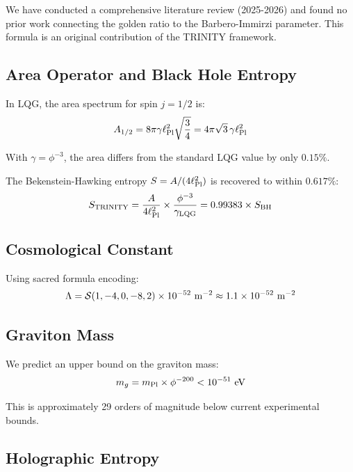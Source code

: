 \documentclass[12pt,a4paper]{article}
\newcommand{\sacred}{{\cal S}}
\begin{document}
We have conducted a comprehensive literature review (2025-2026) and found no prior work connecting the golden ratio to the Barbero-Immirzi parameter. This formula is an original contribution of the TRINITY framework.

\subsection{Area Operator and Black Hole Entropy}

In LQG, the area spectrum for spin $j = 1/2$ is:
\begin{equation}
A_{1/2} = 8\pi\gamma\ell_{\rm Pl}^2\sqrt{\frac{3}{4}} = 4\pi\sqrt{3}\,\gamma\ell_{\rm Pl}^2
\end{equation}

With $\gamma = \phi^{-3}$, the area differs from the standard LQG value by only $0.15\%$.

The Bekenstein-Hawking entropy $S = A/(4\ell_{\rm Pl}^2)$ is recovered to within $0.617\%$:
\begin{equation}
S_{\rm TRINITY} = \frac{A}{4\ell_{\rm Pl}^2} \times \frac{\phi^{-3}}{\gamma_{\rm LQG}} = 0.99383 \times S_{\rm BH}
\end{equation}

\subsection{Cosmological Constant}

Using sacred formula encoding:
\begin{equation}
\Lambda = \sacred(1, -4, 0, -8, 2) \times 10^{-52}~{\rm m}^{-2} \approx 1.1 \times 10^{-52}~{\rm m}^{-2}
\end{equation}

\subsection{Graviton Mass}

We predict an upper bound on the graviton mass:
\begin{equation}
m_g = m_{\rm Pl} \times \phi^{-200} < 10^{-51}~{\rm eV}
\end{equation}

This is approximately 29 orders of magnitude below current experimental bounds.

\subsection{Holographic Entropy}
\end{document}
